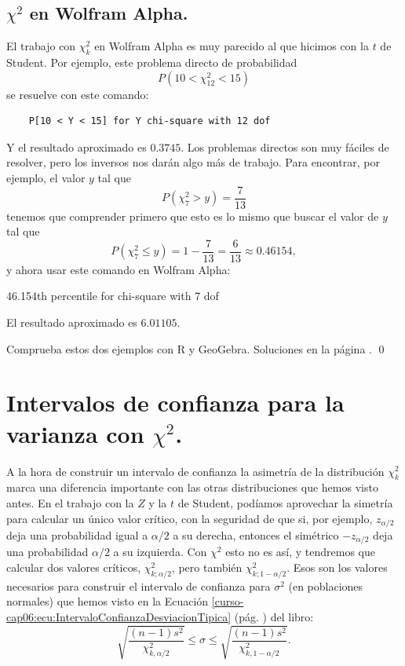 \documentclass[10pt,a4paper]{article}\usepackage[]{graphicx}\usepackage[]{color}
\newcounter {cont01}
\begin{document}
\subsection{$\chi^2$ en Wolfram Alpha.}
\label{tut06:subsec:Chi2EnWolframAlpha}

El trabajo con $\chi^2_k$ en Wolfram Alpha es muy parecido al que hicimos con la $t$ de Student. Por ejemplo,  este problema directo de probabilidad
\[P(10 < \chi^2_{12} < 15)\]
se resuelve con este comando:
\begin{verbatim}
    P[10 < Y < 15] for Y chi-square with 12 dof
\end{verbatim}
Y el resultado aproximado es $0.3745$. Los problemas directos son muy fáciles de resolver, pero los inversos nos darán algo más de trabajo. Para encontrar, por ejemplo, el valor $y$ tal que
\[P( \chi^2_{7} > y) = \dfrac{7}{13}\]
tenemos que comprender primero que esto es lo mismo que buscar el valor de $y$ tal que
\[P( \chi^2_{7} \leq y) = 1 - \dfrac{7}{13} = \dfrac{6}{13}\approx 0.46154,\]
y ahora usar este comando en Wolfram Alpha:
\begin{center}
    46.154th percentile  for chi-square with 7 dof
\end{center}
El resultado aproximado es $6.01105$.

\begin{ejercicio}
\label{tut06:ejercicio20}
Comprueba estos dos ejemplos con R y GeoGebra. Soluciones en la página \pageref{tut06:ejercicio20:sol}.
\qed
\end{ejercicio}

\section{Intervalos de confianza para la varianza con $\chi^2$.}
\label{tut06:sec:IntervalosConfianzaVarianzaChiCuadrado}

A la hora de construir un intervalo de confianza la asimetría de la distribución $\chi^2_k$ marca una diferencia importante con las otras distribuciones que hemos visto antes. En el trabajo con la $Z$ y la $t$ de Student, podíamos aprovechar la simetría para calcular un único valor crítico, con la seguridad de que si, por ejemplo, $z_{\alpha/2}$ deja una probabilidad igual a $\alpha/2$ a su derecha, entonces el simétrico $-z_{\alpha/2}$ deja una probabilidad $\alpha/2$ a su izquierda. Con $\chi^2$ esto no es así, y tendremos que calcular dos valores críticos, $\chi^2_{k;\alpha/2}$, pero también $\chi^2_{k;1-\alpha/2}$. Esos son los valores necesarios para construir el intervalo de confianza para $\sigma^2$  (en poblaciones normales) que hemos visto en la Ecuación \ref{curso-cap06:ecu:IntervaloConfianzaDesviacionTipica} (pág. \pageref{curso-cap06:ecu:IntervaloConfianzaDesviacionTipica}) del libro:
       \[
       \sqrt{\dfrac{(n-1)s^2}{\chi^2_{k,\alpha/2}}}\leq\sigma\leq\sqrt{\dfrac{(n-1)s^2}{\chi^2_{k,1-\alpha/2}}}.
       \]
\end{document}
